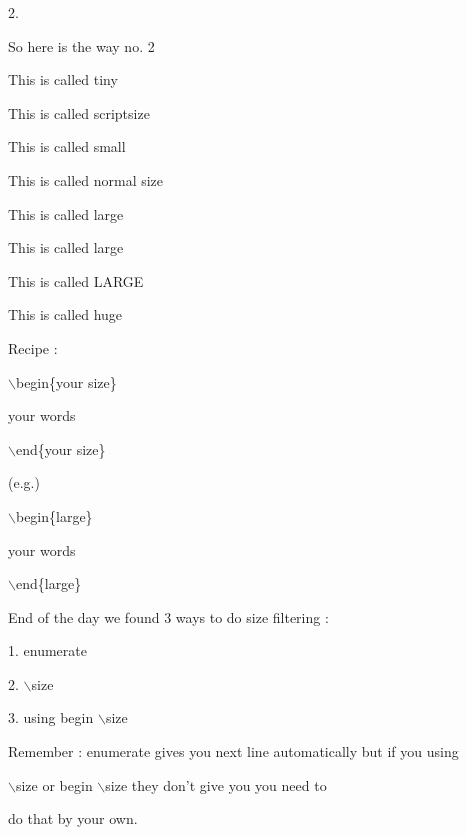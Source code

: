 \documentclass[11pt]{article}
\begin{document}
{\large 2.}

So here is the way no. 2

\begin{tiny}
This is called tiny
\end{tiny}

\begin{scriptsize}
This is called scriptsize
\end{scriptsize}

\begin{small}
This is called small
\end{small}

\begin{normalsize}
This is called normal size
\end{normalsize}

\begin{large}
This is called large
\end{large}

\begin{Large}
This is called large
\end{Large}

\begin{LARGE}
This is called LARGE
\end{LARGE}

\begin{huge}
This is called huge
\end{huge}

Recipe :

$\backslash$begin\{your size\}

your words

$\backslash$end\{your size\}

(e.g.)

$\backslash$begin\{large\}

your words

$\backslash$end\{large\}

\vspace{1cm}

End of the day we found 3 ways to do size filtering :

1. enumerate

2. $\backslash$size

3. using begin $\backslash$size 

Remember : enumerate gives you next line automatically but if you using

$\backslash$size or begin $\backslash$size they don't give you you need to

do that by your own.
\end{document}
